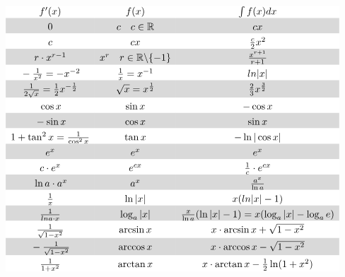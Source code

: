\[ \begin{matrix}
\rowcolor{white} f'(x) & f(x) & \int f(x) dx\\
\rowcolor{lgray} \rule{0pt}{12pt}0 & c \quad c \in \mathbb{R} & cx \\
\rowcolor{white} \rule{0pt}{12pt}c & cx & \frac{c}{2}x^2 \\
\rowcolor{lgray} \rule{0pt}{12pt}r \cdot x^{r-1} & x^r 
\quad r \in \mathbb{R} \backslash \{-1\} & \frac{x^{r+1}}{r+1} \\
\rowcolor{white} \rule{0pt}{12pt}-\frac{1}{x^2} = -x^{-2} 
& \frac{1}{x} = x^{-1} & ln{|x|} \\
\rowcolor{lgray} \rule{0pt}{12pt}\frac{1}{2\sqrt{x}} 
= \frac{1}{2}x^{-\frac{1}{2}} & \sqrt{x} = x^{\frac{1}{2}} 
& \frac{2}{3}x^{\frac{3}{2}} \\
\rowcolor{white} \rule{0pt}{12pt}\cos x & \sin x & -\cos x \\
\rowcolor{lgray} \rule{0pt}{12pt}-\sin x & \cos x & \sin x \\
\rowcolor{white} \rule{0pt}{12pt}1 + \tan^2 x = \frac{1}{\cos^2 x} & \tan x 
& -\ln |\cos x| \\
\rowcolor{lgray} \rule{0pt}{12pt}e^x & e^x & e^x \\
\rowcolor{white} \rule{0pt}{12pt}c \cdot e^x & e^{cx} 
& \frac{1}{c} \cdot e^{cx} \\
\rowcolor{lgray} \rule{0pt}{12pt}\ln a \cdot a^x & a^x & \frac{a^x}{\ln a} \\
\rowcolor{white} \rule{0pt}{12pt}\frac{1}{x} & \ln |x| & x(ln |x| - 1) \\
\rowcolor{lgray} \rule{0pt}{12pt}\frac{1}{ln a \cdot x} & \log_a |x| 
& \frac{x}{\ln a}(\ln |x| - 1) = x(\log_a |x| - \log_a e) \\
\rowcolor{white} \rule{0pt}{12pt}\frac{1}{\sqrt{1 - x^2}} & \arcsin x 
& x \cdot \arcsin x + \sqrt{1 - x^2} \\
\rowcolor{lgray} \rule{0pt}{12pt}-\frac{1}{\sqrt{1 - x^2}} & \arccos x 
& x \cdot \arccos x - \sqrt{1 - x^2} \\
\rowcolor{white} \rule{0pt}{12pt}\frac{1}{1 + x^2} & \arctan x 
& x \cdot \arctan x - \frac{1}{2}\ln(1 + x^2) \\
\end{matrix} \]
\normalsize
